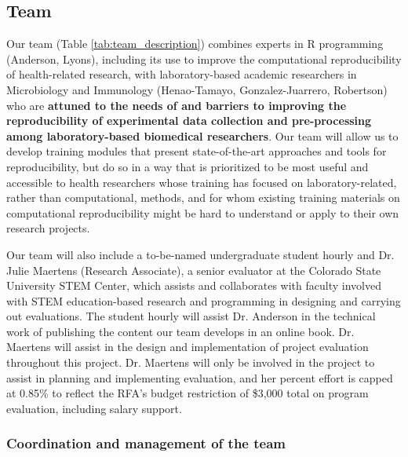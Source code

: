\documentclass[pdftex,english,11pt,parskip=half]{scrartcl}
\begin{document}
\subsection{Team}



Our team (Table \ref{tab:team_description}) combines experts in R programming (Anderson, Lyons), including its use
to improve the computational reproducibility of health-related research, with
laboratory-based academic researchers in Microbiology and Immunology
(Henao-Tamayo, Gonzalez-Juarrero, Robertson) who are \textbf{attuned to the
needs of and barriers to improving the reproducibility of experimental data
collection and pre-processing among laboratory-based biomedical researchers}.
Our team will allow us to develop training modules that present state-of-the-art
approaches and tools for reproducibility, but do so in a way that is prioritized
to be most useful and accessible to health researchers whose training has
focused on laboratory-related, rather than computational, methods, and for whom
existing training materials on computational reproducibility might be hard to
understand or apply to their own research projects. 

\noindent Our team will also include a to-be-named undergraduate student hourly and Dr. Julie Maertens (Research Associate), a senior evaluator
at the Colorado State University STEM Center, which assists and collaborates
with faculty involved with STEM education-based research and programming in
designing and carrying out evaluations. The student hourly will assist Dr. Anderson
in the technical work of publishing the content our team develops in an online book. 
Dr. Maertens will assist in the design and
implementation of project evaluation throughout this project. Dr. Maertens will
only be involved in the project to assist in planning and implementing
evaluation, and her percent effort is capped at 0.85\% to reflect the RFA's
budget restriction of \$3,000 total on program evaluation, including salary
support.

\subsubsection*{Coordination and management of the team}


\end{document}
